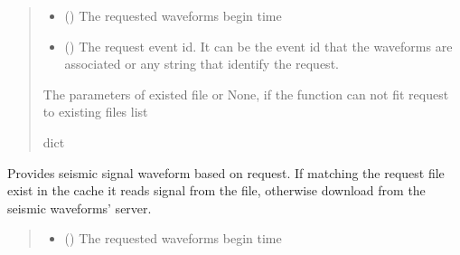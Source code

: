 \documentclass[letterpaper,10pt,english]{sphinxmanual}
\begin{document}
\begin{fulllineitems}
\begin{fulllineitems}
\begin{quote}
\begin{description}
\begin{itemize}
\item {} 
\sphinxAtStartPar
{} () \textendash{} The requested waveforms begin time

\item {} 
\sphinxAtStartPar
{} () \textendash{} The request event id. It can be the event id that the waveforms are associated
or any string that identify the request.

\end{itemize}

\sphinxAtStartPar
The parameters of existed file or None,
if the function can not fit request to existing files list

\sphinxAtStartPar
dict

\end{description}\end{quote}

\end{fulllineitems}


\begin{fulllineitems}
\label{\detokenize{api_core:core.signal_utils.StreamLoader.get_signal}}
\pysigstartsignatures
{}
\pysigstopsignatures
\sphinxAtStartPar
Provides seismic signal waveform based on request.
If matching the request file exist in the cache it reads signal from the file,
otherwise download from the seismic waveforms’ server.
\begin{quote}\begin{description}
\begin{itemize}
\item {} 
\sphinxAtStartPar
{} () \textendash{} The requested waveforms begin time


\end{itemize}
\end{description}
\end{quote}
\end{fulllineitems}
\end{fulllineitems}
\end{document}
